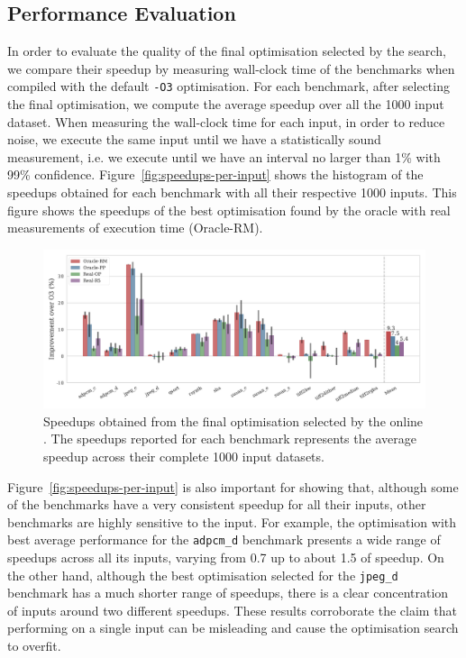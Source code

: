 \subsection{Performance Evaluation}

In order to evaluate the quality of the final optimisation selected by the {\itercomp} search, we compare their speedup by measuring wall-clock time of the benchmarks when compiled with the default \texttt{-O3} optimisation.
For each benchmark, after selecting the final optimisation, we compute the average speedup over all the 1000 input dataset.
When measuring the wall-clock time for each input, in order to reduce noise, we execute the same input until we have a statistically sound measurement, i.e. we execute until we have an interval no larger than 1\% with 99\% confidence.
Figure~\ref{fig:speedups-per-input} shows the histogram of the speedups obtained for each benchmark with all their respective 1000 inputs.
This figure shows the speedups of the best optimisation found by the oracle with real measurements of execution time (Oracle-RM).

\begin{figure}[htb]
    \centering
    \includegraphics[width=\textwidth]{figs/speedups.pdf}
    \caption{Speedups obtained from the final optimisation selected by the online {\itercomp}.
	         The speedups reported for each benchmark represents the average speedup across their complete 1000 input datasets.}
    \label{fig:speedups}
\end{figure}
 
Figure~\ref{fig:speedups-per-input} is also important for showing that, although some of the benchmarks have a very consistent speedup for all their inputs,
other benchmarks are highly sensitive to the input.
For example, the optimisation with best average performance for the \texttt{adpcm\_d} benchmark presents a wide range of speedups across all its inputs,
varying from 0.7 up to about 1.5 of speedup.
On the other hand, although the best optimisation selected for the \texttt{jpeg\_d} benchmark has a much shorter range of speedups, there is a clear concentration of inputs around two different speedups.
These results corroborate the claim that performing {\itercomp} on a single input can be misleading and cause the optimisation search to overfit.

